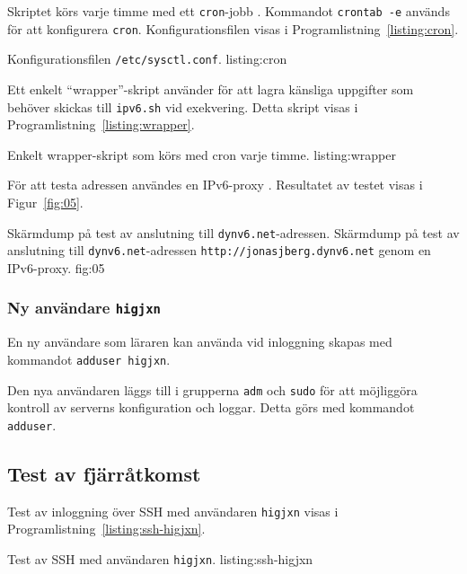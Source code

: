Skriptet körs varje timme med ett \texttt{cron}-jobb \cite{misc:crontutorial}.
Kommandot \texttt{crontab -e} används för att konfigurera \texttt{cron}.
Konfigurationsfilen visas i Programlistning~\ref{listing:cron}.

             {Konfigurationsfilen \texttt{/etc/sysctl.conf}.}
             {listing:cron}

Ett enkelt ``wrapper''-skript använder för att lagra känsliga uppgifter som
behöver skickas till \texttt{ipv6.sh} vid exekvering. Detta skript visas i
Programlistning~\ref{listing:wrapper}.

            {Enkelt wrapper-skript som körs med cron varje timme.}
            {listing:wrapper}





För att testa adressen användes en IPv6-proxy \cite{ipv6:ipv6proxy}.
Resultatet av testet visas i Figur~\ref{fig:05}.

           {Skärmdump på test av anslutning till \texttt{dynv6.net}-adressen.}
           {Skärmdump på test av anslutning till \texttt{dynv6.net}-adressen 
					  \texttt{http://jonasjberg.dynv6.net} genom en IPv6-proxy.}
           {fig:05}



\subsubsection{Ny användare \texttt{higjxn}}
En ny användare som läraren kan använda vid inloggning skapas med kommandot
\texttt{adduser higjxn}.

Den nya användaren läggs till i grupperna \texttt{adm} och \texttt{sudo} för
att möjliggöra kontroll av serverns konfiguration och loggar. Detta görs med
kommandot \texttt{adduser}.


\subsection{Test av fjärråtkomst}
Test av inloggning över SSH med användaren \texttt{higjxn} visas i
Programlistning~\ref{listing:ssh-higjxn}.

            {Test av SSH med användaren \texttt{higjxn}.}
            {listing:ssh-higjxn}

